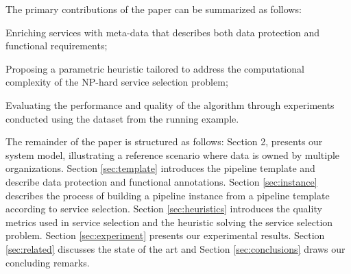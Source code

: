 The primary contributions of the paper can be summarized as follows:
\begin{enumerate*}
  \item Enriching services with meta-data that describes both data protection and functional requirements;
  \item Proposing a parametric heuristic tailored to address the computational complexity of the NP-hard service selection problem;
  \item Evaluating the performance and quality of the algorithm through experiments conducted using the dataset from the running example.
\end{enumerate*}

The remainder of the paper is structured as follows: Section 2, presents our system model, illustrating a reference scenario where data is owned by multiple organizations. Section \ref{sec:template} introduces the pipeline template and describe data protection and functional annotations. Section \ref{sec:instance} describes the process of building a pipeline instance from a pipeline template according to service selection. Section \ref{sec:heuristics} introduces the quality metrics used in service selection and the heuristic solving the service selection problem. Section \ref{sec:experiment} presents our experimental results. Section \ref{sec:related} discusses the state of the art and Section \ref{sec:conclusions} draws our concluding remarks.
